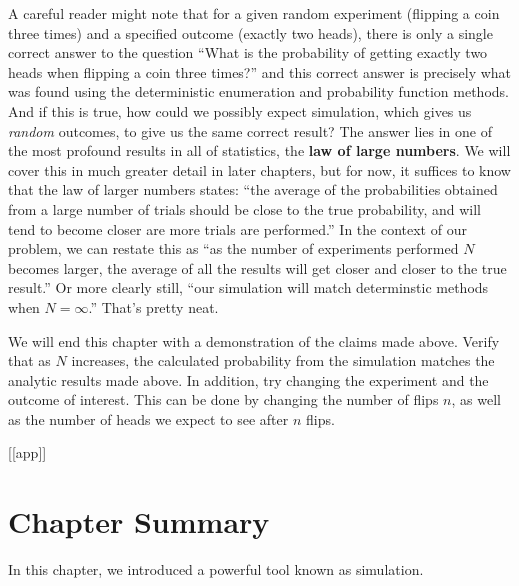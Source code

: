 \documentclass[
]{book}
\theoremstyle{definition}
\theoremstyle{definition}
\theoremstyle{definition}
\theoremstyle{remark}
\begin{document}
A careful reader might note that for a given random experiment (flipping a coin three times) and a specified outcome (exactly two heads), there is only a single correct answer to the question ``What is the probability of getting exactly two heads when flipping a coin three times?'' and this correct answer is precisely what was found using the deterministic enumeration and probability function methods. And if this is true, how could we possibly expect simulation, which gives us \emph{random} outcomes, to give us the same correct result? The answer lies in one of the most profound results in all of statistics, the \textbf{law of large numbers}. We will cover this in much greater detail in later chapters, but for now, it suffices to know that the law of larger numbers states: ``the average of the probabilities obtained from a large number of trials should be close to the true probability, and will tend to become closer are more trials are performed.'' In the context of our problem, we can restate this as ``as the number of experiments performed \(N\) becomes larger, the average of all the results will get closer and closer to the true result.'' Or more clearly still, ``our simulation will match determinstic methods when \(N = \infty\).'' That's pretty neat.

We will end this chapter with a demonstration of the claims made above. Verify that as \(N\) increases, the calculated probability from the simulation matches the analytic results made above. In addition, try changing the experiment and the outcome of interest. This can be done by changing the number of flips \(n\), as well as the number of heads we expect to see after \(n\) flips.

{[}{[}app{]}{]}

\hypertarget{chapter-summary}{%
\section{Chapter Summary}\label{chapter-summary}}

In this chapter, we introduced a powerful tool known as simulation.
\end{document}
